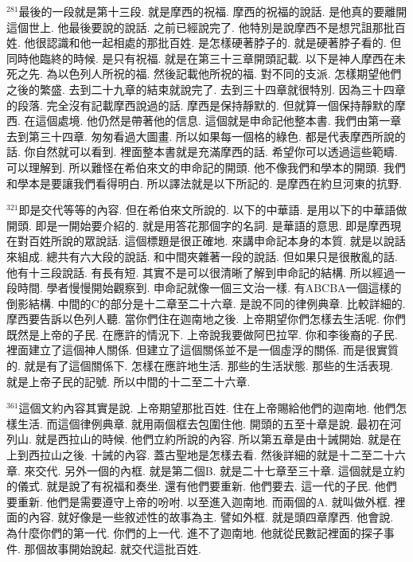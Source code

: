 \documentclass{book}
\begin{document}
$^{281}$最後的一段就是第十三段.
就是摩西的祝福.
摩西的祝福的說話.
是他真的要離開這個世上.
他最後要說的說話.
之前已經說完了.
他特別是說摩西不是想咒詛那批百姓.
他很認識和他一起相處的那批百姓.
是怎樣硬著脖子的.
就是硬著脖子看的.
但同時他臨終的時候.
是只有祝福.
就是在第三十三章開頭記載.
以下是神人摩西在未死之先.
為以色列人所祝的福.
然後記載他所祝的福.
對不同的支派.
怎樣期望他們之後的繁盛.
去到二十九章的結束就說完了.
去到三十四章就很特別.
因為三十四章的段落.
完全沒有記載摩西說過的話.
摩西是保持靜默的.
但就算一個保持靜默的摩西.
在這個處境.
他仍然是帶著他的信息.
這個就是申命記他整本書.
我們由第一章去到第三十四章.
匆匆看過大圖畫.
所以如果每一個格的綠色.
都是代表摩西所說的話.
你自然就可以看到.
裡面整本書就是充滿摩西的話.
希望你可以透過這些範疇.
可以理解到.
所以難怪在希伯來文的申命記的開頭.
他不像我們和學本的開頭.
我們和學本是要讓我們看得明白.
所以譯法就是以下所記的.
是摩西在約旦河東的抗野.

$^{321}$即是交代等等的內容.
但在希伯來文所說的.
以下的中華語.
是用以下的中華語做開頭.
即是一開始要介紹的.
就是用答花那個字的名詞.
是華語的意思.
即是摩西現在對百姓所說的眾說話.
這個標題是很正確地.
來講申命記本身的本質.
就是以說話來組成.
總共有六大段的說話.
和中間夾雜著一段的說話.
但如果只是很散亂的話.
他有十三段說話.
有長有短.
其實不是可以很清晰了解到申命記的結構.
所以經過一段時間.
學者慢慢開始觀察到.
申命記就像一個三文治一樣.
有ABCBA一個這樣的倒影結構.
中間的C的部分是十二章至二十六章.
是說不同的律例典章.
比較詳細的.
摩西要告訴以色列人聽.
當你們住在迦南地之後.
上帝期望你們怎樣去生活呢.
你們既然是上帝的子民.
在應許的情況下.
上帝說我要做阿巴拉罕.
你和李後裔的子民.
裡面建立了這個神人關係.
但建立了這個關係並不是一個虛浮的關係.
而是很實質的.
就是有了這個關係下.
怎樣在應許地生活.
那些的生活狀態.
那些的生活表現.
就是上帝子民的記號.
所以中間的十二至二十六章.

$^{361}$這個文約內容其實是說.
上帝期望那批百姓.
住在上帝賜給他們的迦南地.
他們怎樣生活.
而這個律例典章.
就用兩個框去包圍住他.
開頭的五至十章是說.
最初在河列山.
就是西拉山的時候.
他們立約所說的內容.
所以第五章是由十誡開始.
就是在上到西拉山之後.
十誡的內容.
蓋古聖地是怎樣去看.
然後詳細的就是十二至二十六章.
來交代.
另外一個的內框.
就是第二個B.
就是二十七章至三十章.
這個就是立約的儀式.
就是說了有祝福和奏坐.
還有他們要重新.
他們要去.
這一代的子民.
他們要重新.
他們是需要遵守上帝的吩咐.
以至進入迦南地.
而兩個的A.
就叫做外框.
裡面的內容.
就好像是一些敘述性的故事為主.
譬如外框.
就是頭四章摩西.
他會說.
為什麼你們的第一代.
你們的上一代.
進不了迦南地.
他就從民數記裡面的探子事件.
那個故事開始說起.
就交代這批百姓.
\end{document}
